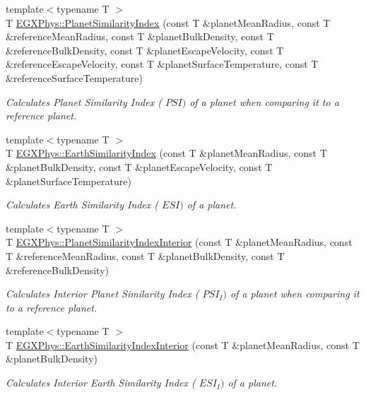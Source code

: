 \begin{DoxyCompactItemize}
{\footnotesize template$<$typename T $>$ }\\T \hyperlink{group___astrophysics_ga62e8b781c301df60bd04af3183a965eb}{E\+G\+X\+Phys\+::\+Planet\+Similarity\+Index} (const T \&planet\+Mean\+Radius, const T \&reference\+Mean\+Radius, const T \&planet\+Bulk\+Density, const T \&reference\+Bulk\+Density, const T \&planet\+Escape\+Velocity, const T \&reference\+Escape\+Velocity, const T \&planet\+Surface\+Temperature, const T \&reference\+Surface\+Temperature)
\begin{DoxyCompactList}\small\item\em Calculates Planet Similarity Index ( $PSI)$ of a planet when comparing it to a reference planet. \end{DoxyCompactList}\item 
{\footnotesize template$<$typename T $>$ }\\T \hyperlink{group___astrophysics_ga4b86397b1c839c49ac599d49fda207d4}{E\+G\+X\+Phys\+::\+Earth\+Similarity\+Index} (const T \&planet\+Mean\+Radius, const T \&planet\+Bulk\+Density, const T \&planet\+Escape\+Velocity, const T \&planet\+Surface\+Temperature)
\begin{DoxyCompactList}\small\item\em Calculates Earth Similarity Index ( $ESI)$ of a planet. \end{DoxyCompactList}\item 
{\footnotesize template$<$typename T $>$ }\\T \hyperlink{group___astrophysics_ga6dc06a1a8baf6e132abed51fcf410c7f}{E\+G\+X\+Phys\+::\+Planet\+Similarity\+Index\+Interior} (const T \&planet\+Mean\+Radius, const T \&reference\+Mean\+Radius, const T \&planet\+Bulk\+Density, const T \&reference\+Bulk\+Density)
\begin{DoxyCompactList}\small\item\em Calculates Interior Planet Similarity Index ( $PSI_I)$ of a planet when comparing it to a reference planet. \end{DoxyCompactList}\item 
{\footnotesize template$<$typename T $>$ }\\T \hyperlink{group___astrophysics_ga699bcc2f17b8855eaa856595d8032f61}{E\+G\+X\+Phys\+::\+Earth\+Similarity\+Index\+Interior} (const T \&planet\+Mean\+Radius, const T \&planet\+Bulk\+Density)
\begin{DoxyCompactList}\small\item\em Calculates Interior Earth Similarity Index ( $ESI_I)$ of a planet. \end{DoxyCompactList}\item 

\end{DoxyCompactItemize}
